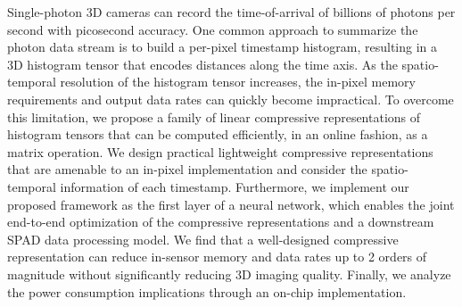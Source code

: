 Single-photon 3D cameras can record the time-of-arrival of billions of photons per second with picosecond accuracy. One common approach to summarize the photon data stream is to build a per-pixel timestamp histogram, resulting in a 3D histogram tensor that encodes distances along the time axis. As the spatio-temporal resolution of the histogram tensor increases, the in-pixel memory requirements and output data rates can quickly become impractical. To overcome this limitation, we propose a family of linear compressive representations of histogram tensors that can be computed efficiently, in an online fashion, as a matrix operation. We design practical lightweight compressive representations that are amenable to an in-pixel implementation and consider the spatio-temporal information of each timestamp. Furthermore, we implement our proposed framework as the first layer of a neural network, which enables the joint end-to-end optimization of the compressive representations and a downstream SPAD data processing model. We find that a well-designed compressive representation can reduce in-sensor memory and data rates up to 2 orders of magnitude without significantly reducing 3D imaging quality. Finally, we analyze the power consumption implications through an on-chip implementation.
